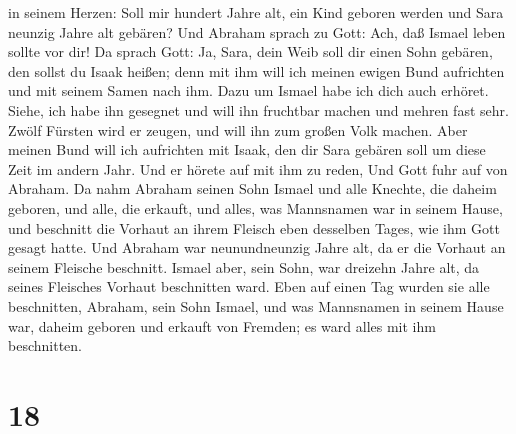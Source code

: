 in seinem Herzen: Soll mir hundert Jahre alt, ein Kind geboren werden
und Sara neunzig Jahre alt gebären?  Und Abraham sprach zu
Gott: Ach, daß Ismael leben sollte vor dir!  Da sprach
Gott: Ja, Sara, dein Weib soll dir einen Sohn gebären, den sollst du
Isaak heißen; denn mit ihm will ich meinen ewigen Bund aufrichten und
mit seinem Samen nach ihm.  Dazu um Ismael habe ich dich
auch erhöret. Siehe, ich habe ihn gesegnet und will ihn fruchtbar machen
und mehren fast sehr. Zwölf Fürsten wird er zeugen, und will ihn zum
großen Volk machen.  Aber meinen Bund will ich aufrichten
mit Isaak, den dir Sara gebären soll um diese Zeit im andern Jahr.
 Und er hörete auf mit ihm zu reden, Und Gott fuhr auf von
Abraham.  Da nahm Abraham seinen Sohn Ismael und alle
Knechte, die daheim geboren, und alle, die erkauft, und alles, was
Mannsnamen war in seinem Hause, und beschnitt die Vorhaut an ihrem
Fleisch eben desselben Tages, wie ihm Gott gesagt hatte. 
Und Abraham war neunundneunzig Jahre alt, da er die Vorhaut an seinem
Fleische beschnitt.  Ismael aber, sein Sohn, war dreizehn
Jahre alt, da seines Fleisches Vorhaut beschnitten ward. 
Eben auf einen Tag wurden sie alle beschnitten, Abraham, sein Sohn
Ismael,  und was Mannsnamen in seinem Hause war, daheim
geboren und erkauft von Fremden; es ward alles mit ihm beschnitten.

\hypertarget{section-17}{%
\section{18}\label{section-17}}

